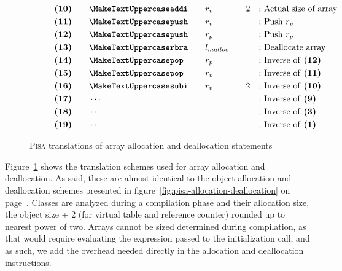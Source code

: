 \begin{figure}[ht]
\begin{subfigure}[t]{0.495\linewidth}
{\begin{minipage}{\linewidth}
\begin{alignat*}{5}
                    &\textbf{(10)}\quad&&\inst{addi}\quad && r_v \quad && 2 &&\text{; Actual size of array}\\
                    &\textbf{(11)}\quad&&\inst{push}\quad && r_v \quad && &&\text{; Push $r_v$}\\
                    &\textbf{(12)}\quad&&\inst{push}\quad && r_p \quad && &&\text{; Push $r_p$}\\
                    &\textbf{(13)}\quad&&\inst{rbra}\quad && l_{malloc} \quad && &&\text{; Deallocate array}\\
                    &\textbf{(14)}\quad&&\inst{pop}\quad && r_p \quad && &&\text{; Inverse of \textbf{(12)}}\\
                    &\textbf{(15)}\quad&&\inst{pop}\quad && r_v \quad && &&\text{; Inverse of \textbf{(11)}}\\
                    &\textbf{(16)}\quad&&\inst{subi}\quad && r_v \quad && 2 &&\text{; Inverse of \textbf{(10)}}\\
                    &\textbf{(17)}\quad&&\cdots\quad &&\quad && &&\text{; Inverse of \textbf{(9)}}\\
                    &\textbf{(18)}\quad&&\cdots\quad && \quad && &&\text{; Inverse of \textbf{(3)}}\\
                    &\textbf{(19)}\quad&&\cdots\quad && \quad && &&\text{; Inverse of \textbf{(1)}}\\
                \end{alignat*}
            \end{minipage}
        }
    \end{subfigure}
    \caption{\textsc{Pisa} translations of array allocation and deallocation statements}
    \label{fig:array-allocation-deallocation}
\end{figure}

Figure~\ref{fig:array-allocation-deallocation} shows the translation schemes used for array allocation and deallocation. As said, these are almost identical to the object allocation and deallocation schemes presented in figure~\ref{fig:pisa-allocation-deallocation} on page~\pageref{fig:pisa-allocation-deallocation}. Classes are analyzed during a compilation phase and their allocation size, the object size + 2 (for virtual table and reference counter) rounded up to nearest power of two. Arrays cannot be sized determined during compilation, as that would require evaluating the expression passed to the initialization call, and as such, we add the overhead needed directly in the allocation and deallocation instructions.   

